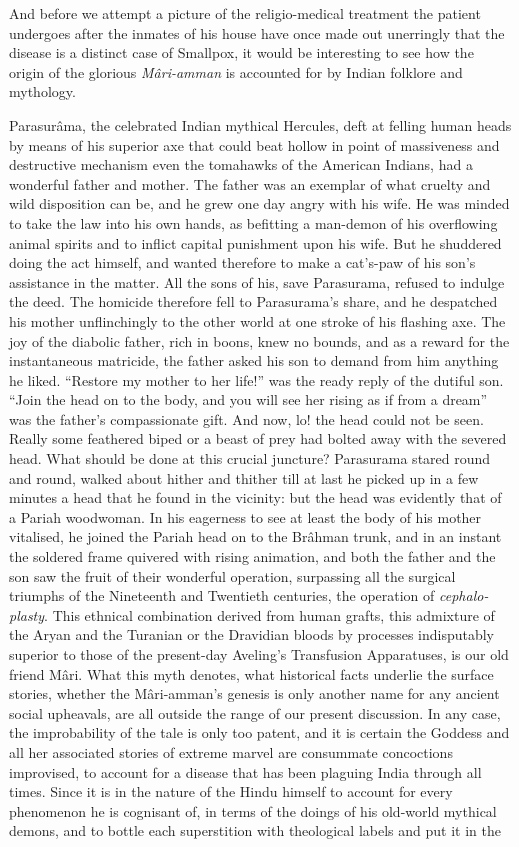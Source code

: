 \documentclass[a4paper, 12pt, oneside, english]{article}
\begin{document}
And before we attempt a picture of the religio-medical treatment the patient undergoes after the inmates of his house have once made out unerringly that the disease is a distinct case of Smallpox, it would be interesting to see how the origin of the glorious \emph{Mâri-amman} is accounted for by Indian folklore and mythology.

Parasurâma, the celebrated Indian mythical Hercules, deft at felling human heads by means of his superior axe that could beat hollow in point of massiveness and destructive mechanism even the tomahawks of the American Indians, had a wonderful father and mother. The father was an exemplar of what cruelty and wild disposition can be, and he grew one day angry with his wife. He was minded to take the law into his own hands, as befitting a man-demon of his overflowing animal spirits and to inflict capital punishment upon his wife. But he shuddered doing the act himself, and wanted therefore to make a cat's-paw of his son's assistance in the matter. All the sons of his, save Parasurama, refused to indulge the deed. The homicide therefore fell to Parasurama's share, and he despatched his mother unflinchingly to the other world at one stroke of his flashing axe. The joy of the diabolic father, rich in boons, knew no bounds, and as a reward for the instantaneous matricide, the father asked his son to demand from him anything he liked. ``Restore my mother to her life!'' was the ready reply of the dutiful son. ``Join the head on to the body, and you will see her rising as if from a dream'' was the father's compassionate gift. And now, lo! the head could not be seen. Really some feathered biped or a beast of prey had bolted away with the severed head. What should be done at this crucial juncture? Parasurama stared round and round, walked about hither and thither till at last he picked up in a few minutes a head that he found in the vicinity: but the head was evidently that of a Pariah woodwoman. In his eagerness to see at least the body of his mother vitalised, he joined the Pariah head on to the Brâhman trunk, and in an instant the soldered frame quivered with rising animation, and both the father and the son saw the fruit of their wonderful operation, surpassing all the surgical triumphs of the Nineteenth and Twentieth centuries, the operation of \emph{cephalo-plasty}. This ethnical combination derived from human grafts, this admixture of the Aryan and the Turanian or the Dravidian bloods by processes indisputably superior to those of the present-day Aveling's Transfusion Apparatuses, is our old friend Mâri. What this myth denotes, what historical facts underlie the surface stories, whether the Mâri-amman's genesis is only another name for any ancient social upheavals, are all outside the range of our present discussion. In any case, the improbability of the tale is only too patent, and it is certain the Goddess and all her associated stories of extreme marvel are consummate concoctions improvised, to account for a disease that has been plaguing India through all times. Since it is in the nature of the Hindu himself to account for every phenomenon he is cognisant of, in terms of the doings of his old-world mythical demons, and to bottle each superstition with theological labels and put it in the 
\end{document}
